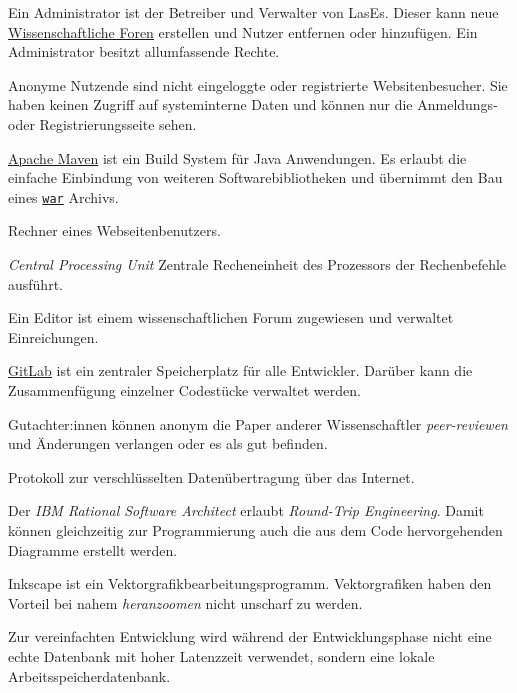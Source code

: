 
\begin{description}
	 Ein Administrator ist der Betreiber und Verwalter von LasEs. Dieser kann neue \hyperref[glo:wissForum]{Wissenschaftliche Foren} erstellen und Nutzer entfernen oder hinzufügen. Ein Administrator besitzt allumfassende Rechte.

	 Anonyme Nutzende sind nicht eingeloggte oder registrierte Websitenbesucher. Sie haben keinen Zugriff auf systeminterne Daten und können nur die Anmeldungs- oder Registrierungsseite sehen.

	 \href{https://maven.apache.org/what-is-maven.html}{Apache Maven} ist ein Build System für Java Anwendungen. Es erlaubt die einfache Einbindung von weiteren Softwarebibliotheken und übernimmt den Bau eines \hyperref[glo:war]{\texttt{war}} Archivs.

	 Rechner eines Webseitenbenutzers.

	 \emph{Central Processing Unit} Zentrale Recheneinheit des Prozessors der Rechenbefehle ausführt.

	 Ein Editor ist einem wissenschaftlichen Forum zugewiesen und verwaltet Einreichungen.

	 \href{https://fimgit.fim.uni-passau.de/users/sign_in}{GitLab} ist ein zentraler Speicherplatz für alle Entwickler. Darüber kann die Zusammenfügung einzelner Codestücke verwaltet werden.

	 Gutachter:innen können anonym die Paper anderer Wissenschaftler \emph{peer-reviewen} und Änderungen verlangen oder es als gut befinden.

	 Protokoll zur verschlüsselten Datenübertragung über das Internet.

	 Der \emph{IBM Rational Software Architect} erlaubt \emph{Round-Trip Engineering}. Damit können gleichzeitig zur Programmierung auch die aus dem Code hervorgehenden Diagramme erstellt werden.

	 Inkscape ist ein Vektorgrafikbearbeitungsprogramm. Vektorgrafiken haben den Vorteil bei nahem \emph{heranzoomen} nicht unscharf zu werden.

	 Zur vereinfachten Entwicklung wird während der Entwicklungsphase nicht eine echte Datenbank mit hoher Latenzzeit verwendet, sondern eine lokale Arbeitsspeicherdatenbank.


\end{description}
